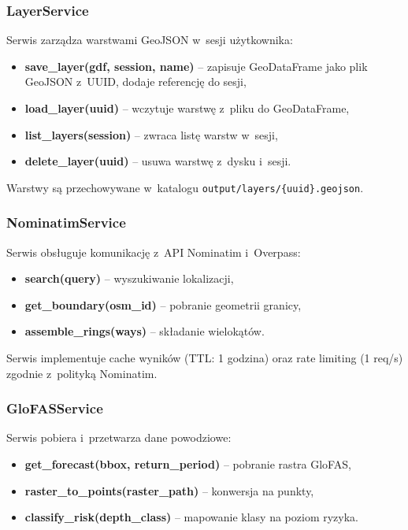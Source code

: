 \subsubsection{LayerService}

Serwis zarządza warstwami GeoJSON w~sesji użytkownika:

\begin{itemize}
    \item \textbf{save\_layer(gdf, session, name)} -- zapisuje GeoDataFrame jako plik GeoJSON z~UUID, dodaje referencję do sesji,
    \item \textbf{load\_layer(uuid)} -- wczytuje warstwę z~pliku do GeoDataFrame,
    \item \textbf{list\_layers(session)} -- zwraca listę warstw w~sesji,
    \item \textbf{delete\_layer(uuid)} -- usuwa warstwę z~dysku i~sesji.
\end{itemize}

Warstwy są przechowywane w~katalogu \texttt{output/layers/\{uuid\}.geojson}.

\subsubsection{NominatimService}

Serwis obsługuje komunikację z~API Nominatim i~Overpass:

\begin{itemize}
    \item \textbf{search(query)} -- wyszukiwanie lokalizacji,
    \item \textbf{get\_boundary(osm\_id)} -- pobranie geometrii granicy,
    \item \textbf{assemble\_rings(ways)} -- składanie wielokątów.
\end{itemize}

Serwis implementuje cache wyników (TTL: 1 godzina) oraz rate limiting (1 req/s) zgodnie z~polityką Nominatim.

\subsubsection{GloFASService}

Serwis pobiera i~przetwarza dane powodziowe:

\begin{itemize}
    \item \textbf{get\_forecast(bbox, return\_period)} -- pobranie rastra GloFAS,
    \item \textbf{raster\_to\_points(raster\_path)} -- konwersja na punkty,
    \item \textbf{classify\_risk(depth\_class)} -- mapowanie klasy na poziom ryzyka.
\end{itemize}

